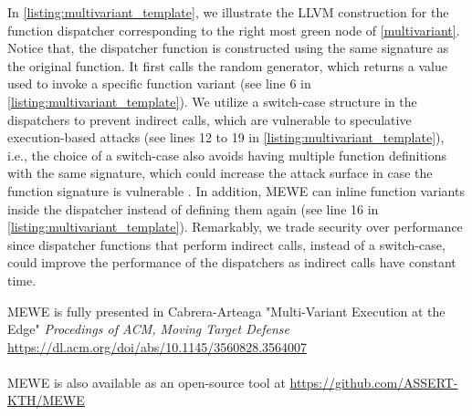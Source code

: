 In  \autoref{listing:multivariant_template}, we illustrate the LLVM construction for the function dispatcher corresponding to the right most green node of \autoref{multivariant}.
Notice that, the dispatcher function is constructed using the same signature as the original function. 
It first calls the random generator, which returns a value used to invoke a specific function variant (see line 6 in \autoref{listing:multivariant_template}). 
We utilize a switch-case structure in the dispatchers to prevent indirect calls, which are vulnerable to speculative execution-based attacks \cite{Narayan2021Swivel} (see lines 12 to 19 in \autoref{listing:multivariant_template}), i.e., the choice of a switch-case also avoids having multiple function definitions with the same signature, which could increase the attack surface in case the function signature is vulnerable \cite{johnson2021}.
In addition, MEWE can inline function variants inside the dispatcher instead of defining them again (see line 16 in \autoref{listing:multivariant_template}).
Remarkably, we trade security over performance since dispatcher functions that perform indirect calls, instead of a switch-case,  could improve the performance of the dispatchers as indirect calls have constant time.






\begin{tcolorbox}[title=Contribution paper and artifact,boxrule=1pt,arc=.2em,boxsep=1.0mm]
  MEWE is fully presented in Cabrera-Arteaga \etal "Multi-Variant Execution at the Edge"
  \emph{Procedings of ACM, Moving Target Defense}
 \url{https://dl.acm.org/doi/abs/10.1145/3560828.3564007}
 \\\\
 MEWE is also available as an open-source tool at \url{https://github.com/ASSERT-KTH/MEWE}
\end{tcolorbox}